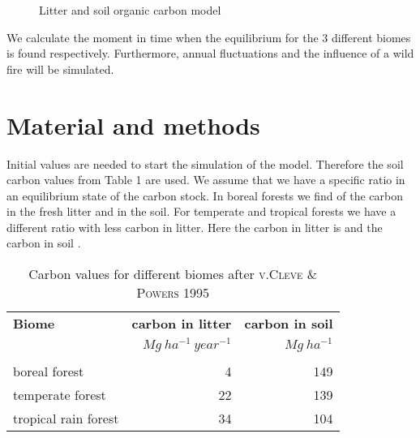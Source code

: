 \documentclass[10pt, a4paper]{article}
\begin{document}
\begin{figure}[!htbp]
	\centering
	\caption{Litter and soil organic carbon model}
\end{figure}

We calculate the moment in time when the equilibrium for the 3 different biomes is found respectively. Furthermore, annual fluctuations and the influence of a wild fire will be simulated.  


\section{Material and methods}

Initial values are needed to start the simulation of the model. Therefore the soil carbon values from Table 1 are used. 
We assume that we have a specific ratio in an equilibrium state of the carbon stock. In boreal forests we find  of the carbon in the fresh litter and  in the soil.  For temperate and tropical forests we have a different ratio with less carbon in litter. Here the carbon in litter is  and the carbon in soil . 


\begin{table}[htbp!]
	\begin{center}
		\caption{Carbon values for different biomes after \textsc{v.Cleve \& Powers 1995}}
		\label{}
		\begin{tabular}{l r r} %
			\textbf{Biome}& \textbf{carbon in litter} & \textbf{carbon in soil}\\
								   & $Mg\ ha^{-1}\ year^{-1}$& $Mg\ ha^{-1}$\\\\
								   
			boreal forest & 4 & 149\\
			temperate forest& 22 & 139\\
			tropical rain forest& 34 & 104\\
		\end{tabular}
	\end{center}
\end{table}
\end{document}
